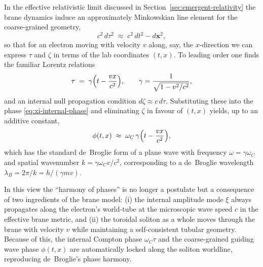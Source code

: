 In the effective relativistic limit discussed in
Section~\ref{sec:emergent-relativity} the brane dynamics induce an
approximately Minkowskian line element for the coarse-grained
geometry,
%
\begin{equation}
  c^2\,d\tau^2
  \;\approx\;
  c^2\,dt^2 - d\mathbf x^2,
  \label{eq:emergent-metric-line-element}
\end{equation}
%
so that for an electron moving with velocity $v$ along, say, the
$x$-direction we can express $\tau$ and $\zeta$ in terms of the lab
coordinates $(t,x)$.
To leading order one finds the familiar Lorentz relations
%
\begin{equation}
  \tau
  \;=\;
  \gamma\Bigl(t - \frac{v x}{c^2}\Bigr),
  \qquad
  \gamma = \frac{1}{\sqrt{1 - v^2/c^2}},
  \label{eq:proper-time-lab}
\end{equation}
%
and an internal null propagation condition $d\zeta \approx c\,d\tau$.
Substituting these into the phase
\eqref{eq:xi-internal-phase} and eliminating $\zeta$ in favour of
$(t,x)$ yields, up to an additive constant,
%
\begin{equation}
  \phi(t,x)
  \;\approx\;
  \omega_C\,\gamma\Bigl(t - \frac{v x}{c^2}\Bigr),
  \label{eq:harmony-phase-lab}
\end{equation}
%
which has the standard de~Broglie form of a plane wave with frequency
$\omega = \gamma\omega_C$ and spatial wavenumber
$k = \gamma\omega_C v / c^2$, corresponding to a de~Broglie
wavelength $\lambda_B = 2\pi/k = h/(\gamma m v)$.

In this view the ``harmony of phases'' is no longer a postulate but a
consequence of two ingredients of the brane model: (i) the internal
amplitude mode $\xi$ always propagates along the electron's world-tube
at the microscopic wave speed $c$ in the effective brane metric, and
(ii) the toroidal soliton as a whole moves through the brane with
velocity $v$ while maintaining a self-consistent tubular geometry.
Because of this, the internal Compton phase $\omega_C\tau$ and the
coarse-grained guiding wave phase $\phi(t,x)$ are automatically locked
along the soliton worldline, reproducing de~Broglie's phase harmony.

